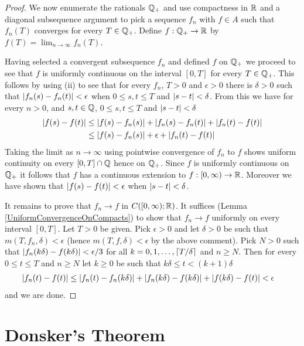 \begin{proof}
We now enumerate the rationals $\mathbb{Q}_+$ and use
compactness in $\mathbb{R}$ and a diagonal
subsequence argument to pick a sequence $f_n$ with $f \in A$ such that
$f_n(T)$ converges for every $T \in \mathbb{Q}_+$.  Define $f :
\mathbb{Q}_+ \to \mathbb{R}$ by $f(T) = \lim_{n \to \infty} f_n(T)$.

Having selected a convergent subsequence $f_n$ and defined $f$ on
$\mathbb{Q}_+$ we proceed to see that $f$ is uniformly continuous on
the
interval $[0,T]$ for every $T \in \mathbb{Q}_+$.
This follows by using (ii) to see that for every $f_n$, $T > 0$ and 
$\epsilon > 0$ there is $\delta > 0$ such that $\left \vert f_n(s) - f_n(t) \right \vert <
\epsilon$ when $0 \leq s,t \leq T$ and $\left \vert s - t \right \vert <\delta$.  From
this we have for every $n>0$, and $s,t \in \mathbb{Q}$, $0 \leq s,t
\leq T$ and $\left \vert s-t \right \vert < \delta$
\begin{align*}
\left \vert f(s) -f(t) \right \vert &\leq \left \vert f(s) -f_n(s) \right \vert + \left \vert f_n(s) -f_n(t) \right \vert +
\left \vert f_n(t) - f(t) \right \vert \\
&\leq \left \vert f(s) -f_n(s) \right \vert + \epsilon +
\left \vert f_n(t) - f(t) \right \vert
\end{align*}
Taking the limit as $n \to \infty$ using pointwise convergence of
$f_n$ to $f$ shows uniform continuity on every
$[0,T] \cap \mathbb{Q}$ hence on $\mathbb{Q}_+$.  Since $f$ is uniformly continuous on
$\mathbb{Q}_+$ it follows that $f$ has a continuous extension to $f :
[0,\infty) \to \mathbb{R}$.  Moreover we have shown that $\left \vert f(s) -f(t) \right \vert
< \epsilon$ when $\left \vert s -t \right \vert < \delta$.

It remains to prove that $f_n \to f$ in $C([0,\infty); \mathbb{R})$.  It
suffices (Lemma \ref{UniformConvergenceOnCompacts}) to show that $f_n
\to f$ uniformly on every interval $[0,T]$.  Let $T > 0$ be given.
Pick $\epsilon > 0$ and let
$\delta > 0$ be such that $m(T,f_n,\delta) < \epsilon$ (hence $m(T,f,\delta)
< \epsilon$ by the above comment).   Pick $N > 0$ such that
$\left \vert f_n(k\delta) - f(k\delta) \right \vert < \epsilon/3$ for all $k=0,1, \dotsc,
\lceil T/\delta \rceil$ and $n \geq N$.  Then for every $0 \leq t \leq T$ and
$n \geq N$ let $k\geq 0$ be such that $k\delta \leq t < (k+1)\delta$
\begin{align*}
\left \vert f_n(t) - f(t) \right \vert &\leq \left \vert f_n(t) - f_n(k\delta) \right \vert
+\left \vert f_n(k\delta) - f(k\delta) \right \vert +\left \vert f(k\delta) - f(t) \right \vert < \epsilon
\end{align*}
and we are done.
\end{proof}

\section{Donsker's Theorem}

